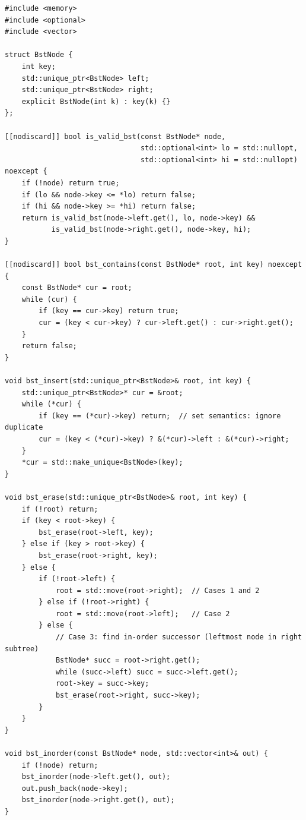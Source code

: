\documentclass[11pt,a4paper]{article}
\theoremstyle{definition}
\begin{document}
\begin{lstlisting}[caption={RAII Binary Search Tree with safe \texttt{std::optional} range validation and Hibbard deletion.}]
#include <memory>
#include <optional>
#include <vector>

struct BstNode {
    int key;
    std::unique_ptr<BstNode> left;
    std::unique_ptr<BstNode> right;
    explicit BstNode(int k) : key(k) {}
};

[[nodiscard]] bool is_valid_bst(const BstNode* node,
                                std::optional<int> lo = std::nullopt,
                                std::optional<int> hi = std::nullopt) noexcept {
    if (!node) return true;
    if (lo && node->key <= *lo) return false;
    if (hi && node->key >= *hi) return false;
    return is_valid_bst(node->left.get(), lo, node->key) &&
           is_valid_bst(node->right.get(), node->key, hi);
}

[[nodiscard]] bool bst_contains(const BstNode* root, int key) noexcept {
    const BstNode* cur = root;
    while (cur) {
        if (key == cur->key) return true;
        cur = (key < cur->key) ? cur->left.get() : cur->right.get();
    }
    return false;
}

void bst_insert(std::unique_ptr<BstNode>& root, int key) {
    std::unique_ptr<BstNode>* cur = &root;
    while (*cur) {
        if (key == (*cur)->key) return;  // set semantics: ignore duplicate
        cur = (key < (*cur)->key) ? &(*cur)->left : &(*cur)->right;
    }
    *cur = std::make_unique<BstNode>(key);
}

void bst_erase(std::unique_ptr<BstNode>& root, int key) {
    if (!root) return;
    if (key < root->key) {
        bst_erase(root->left, key);
    } else if (key > root->key) {
        bst_erase(root->right, key);
    } else {
        if (!root->left) {
            root = std::move(root->right);  // Cases 1 and 2
        } else if (!root->right) {
            root = std::move(root->left);   // Case 2
        } else {
            // Case 3: find in-order successor (leftmost node in right subtree)
            BstNode* succ = root->right.get();
            while (succ->left) succ = succ->left.get();
            root->key = succ->key;
            bst_erase(root->right, succ->key);
        }
    }
}

void bst_inorder(const BstNode* node, std::vector<int>& out) {
    if (!node) return;
    bst_inorder(node->left.get(), out);
    out.push_back(node->key);
    bst_inorder(node->right.get(), out);
}
\end{lstlisting}
\end{document}
